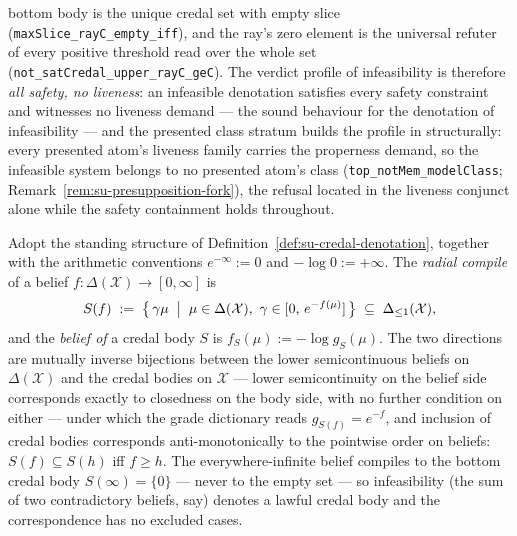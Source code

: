 \begin{remark}
bottom body is the unique credal set with empty slice
(\texttt{maxSlice\_rayC\_empty\_iff}), and the ray's zero element is
the universal refuter of every positive threshold read over the
whole set (\texttt{not\_satCredal\_upper\_rayC\_geC}). The verdict
profile of infeasibility is therefore \emph{all safety, no
liveness}: an infeasible denotation satisfies every safety
constraint and witnesses no liveness demand --- the sound behaviour
for the denotation of infeasibility --- and the presented class
stratum builds the profile in structurally: every presented atom's
liveness family carries the properness demand, so the infeasible
system belongs to no presented atom's class
(\texttt{top\_notMem\_modelClass};
Remark~\ref{rem:su-presupposition-fork}), the refusal located in
the liveness conjunct alone while the safety containment holds
throughout.
\end{remark}

\begin{definition}\label{def:su-belief}%
\label{def:su-penalty-functional}%
Adopt the standing structure of
Definition~\ref{def:su-credal-denotation}, together with the
arithmetic conventions $e^{-\infty} := 0$ and $-\log 0 := +\infty$.
The \emph{radial compile} of a belief
$f \colon \Delta(\mathcal{X}) \to [0,\infty]$ is
\[
  S(f) \;:=\; \bigl\{\, \gamma\mu \;\bigm|\;
    \mu \in \Delta(\mathcal{X}),\
    \gamma \in [0,\, e^{-f(\mu)}] \,\bigr\}
  \;\subseteq\; \Delta_{\le 1}(\mathcal{X}),
\]
and the \emph{belief of} a credal body $S$ is
$f_S(\mu) := -\log g_S(\mu)$. The two directions are mutually
inverse bijections between the lower semicontinuous beliefs
on $\Delta(\mathcal{X})$ and the credal bodies on
$\mathcal{X}$ --- lower semicontinuity on the belief side
corresponds exactly to closedness on the body side, with no further
condition on either --- under which the grade dictionary
reads $g_{S(f)} = e^{-f}$, and inclusion of credal bodies
corresponds anti-monotonically to the pointwise order on beliefs:
$S(f) \subseteq S(h)$ iff $f \ge h$. The everywhere-infinite belief
compiles to the bottom credal body $S(\infty) = \{0\}$ --- never to
the empty set --- so infeasibility (the sum of two contradictory
beliefs, say) denotes a lawful credal body and the
correspondence has no excluded cases.
\end{definition}

